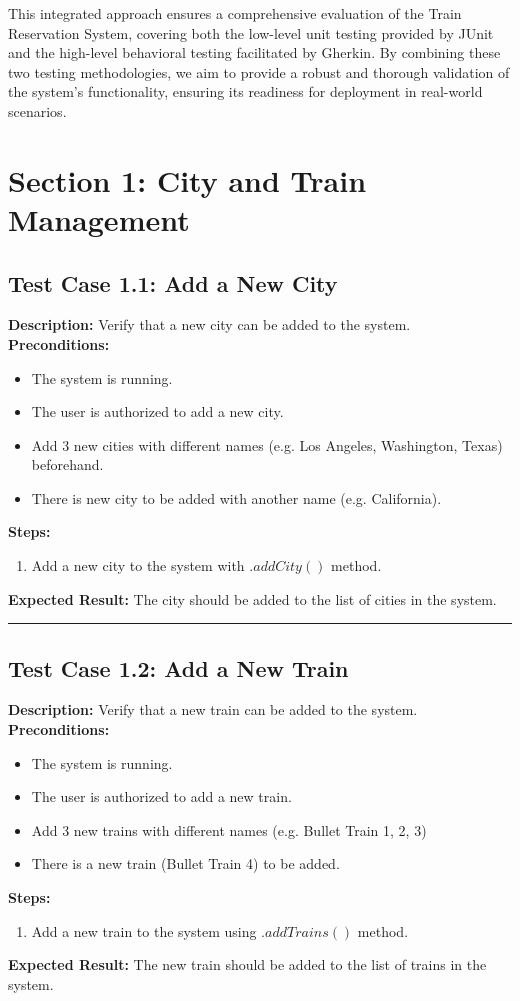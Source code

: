 \documentclass{article}
\begin{document}
This integrated approach ensures a comprehensive evaluation of the Train Reservation System, covering both the low-level unit testing provided by JUnit and the high-level behavioral testing facilitated by Gherkin. By combining these two testing methodologies, we aim to provide a robust and thorough validation of the system's functionality, ensuring its readiness for deployment in real-world scenarios.

\pagebreak

\section{Section 1: City and Train Management}
\bigskip
\bigskip
\subsection{Test Case 1.1: Add a New City}

\textbf{Description:} Verify that a new city can be added to the system.\\
\textbf{Preconditions:}
\begin{itemize}
  \item The system is running.
  \item The user is authorized to add a new city.
  \item Add 3 new cities with different names (e.g. Los Angeles, Washington, Texas) beforehand.
  \item There is new city to be added with another name (e.g. California).
\end{itemize}
\textbf{Steps:}
\begin{enumerate}
  \item Add a new city to the system with $.addCity()$ method.
\end{enumerate}
\textbf{Expected Result:} The city should be added to the list of cities in the system.

\bigskip
\hrule
\bigskip


\subsection{Test Case 1.2: Add a New Train}

\textbf{Description:} Verify that a new train can be added to the system.\\
\textbf{Preconditions:}
\begin{itemize}
  \item The system is running.
  \item The user is authorized to add a new train.
  \item Add 3 new trains with different names (e.g. Bullet Train 1, 2, 3)
  \item There is a new train (Bullet Train 4) to be added.
\end{itemize}
\textbf{Steps:}
\begin{enumerate}
  \item Add a new train to the system using $.addTrains()$ method.
\end{enumerate}
\textbf{Expected Result:} The new train should be added to the list of trains in the system.
\end{document}
